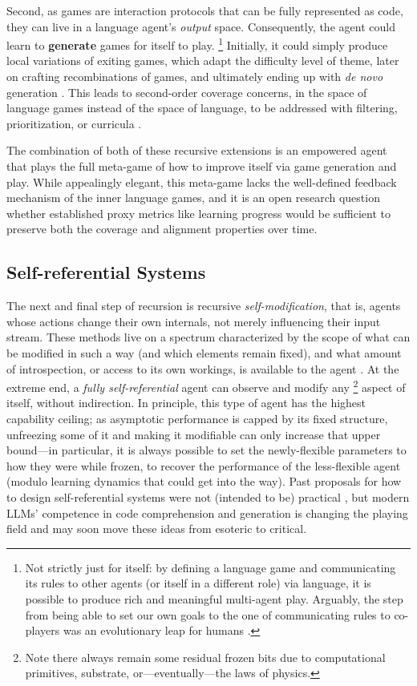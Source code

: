 \documentclass[dvipsnames]{article} %
\begin{document}
Second, as games are interaction protocols that can be fully represented as code, they can live in a language agent's \emph{output} space. Consequently, the agent could learn to {\bf generate} games for itself to play.%
\footnote{Not strictly just for itself: by defining a language game and communicating its rules to other agents (or itself in a different role) via language, it is possible to produce rich and meaningful multi-agent play. Arguably, the step from being able to set our own goals to the one of communicating rules to co-players was an evolutionary leap for humans \citep{tomasello2022evolution}.}
Initially, it could simply produce local variations of exiting games, which  adapt the difficulty level of theme, later on crafting recombinations of games, and ultimately ending up with \emph{de novo} generation \citep{todd2024gavel}.
This leads to second-order coverage concerns, in the space of language games instead of the space of language, to be addressed with filtering, prioritization, or curricula \citep{jaderberg2019human,parker2022evolving}.

The combination of both of these recursive extensions is an empowered agent that plays the full meta-game of how to improve itself via game generation and play. 
While appealingly elegant, this meta-game lacks the well-defined feedback mechanism of the inner language games, and it is an open research question whether established proxy metrics like learning progress would be sufficient to preserve both the coverage and alignment properties over time.



\subsection*{Self-referential Systems}
\label{sec:self-referential}
The next and final step of recursion is recursive \emph{self-modification}, that is, agents whose actions change their own internals, not merely influencing their input stream.
These methods live on a spectrum characterized by the scope of what can be modified in such a way (and which elements remain fixed), and what amount of introspection, or access to its own workings, is available to the agent \citep{schaul2010metalearning}.
At the extreme end, a \emph{fully self-referential} agent can observe and modify any%
\footnote{Note there always remain some residual frozen bits due to computational primitives, substrate, or---eventually---the laws of physics.
}
aspect of itself, without indirection. In principle, this type of agent has the highest capability ceiling; as asymptotic performance is capped by its fixed structure, unfreezing some of it and making it modifiable can only increase that upper bound---in particular, it is always possible to set the newly-flexible parameters to how they were while frozen, to recover the performance of the less-flexible agent (modulo learning dynamics that could get into the way).
Past proposals for how to design self-referential systems were not (intended to be) practical \citep[e.g.,][]{schmidhuber1993self,schmidhuber2003godel,schmidhuber1997shifting,kirsch2022eliminating}, but modern LLMs' competence in code comprehension and generation is changing the playing field and may soon move these ideas from esoteric to critical.
\end{document}
